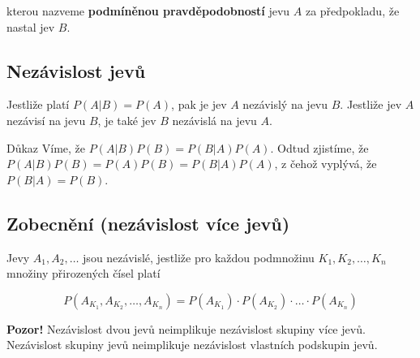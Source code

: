 		kterou nazveme \textbf{podmíněnou pravděpodobností} jevu $A$ za předpokladu, že nastal jev $B$.
		
		\subsection{Nezávislost jevů}
		Jestliže platí $P(A|B)=P(A)$, pak je jev $A$ nezávislý na jevu $B$. Jestliže jev $A$ nezávisí na jevu $B$, je také jev $B$ nezávislá na jevu $A$.
		
		\begin{note}{Důkaz}
			Víme, že $P(A|B)P(B) = P(B|A)P(A)$. Odtud zjistíme, že $P(A|B)P(B)=P(A)P(B)=P(B|A)P(A)$, z čehož vyplývá, že $P(B|A) = P(B)$.
		\end{note}
		
		\subsection{Zobecnění (nezávislost více jevů)}
		Jevy $A_1,A_2,\ldots$ jsou nezávislé, jestliže pro každou podmnožinu $K_1,K_2,\ldots,K_n$ množiny přirozených čísel platí
		
		\[ P(A_{K_1},A_{K_2},\ldots,A_{K_n}) = P(A_{K_1})\cdot P(A_{K_2})\cdot \ldots\cdot P(A_{K_n}) \]
		
		\textbf{Pozor!} Nezávislost dvou jevů neimplikuje nezávislost skupiny více jevů. Nezávislost skupiny jevů neimplikuje nezávislost vlastních podskupin jevů.